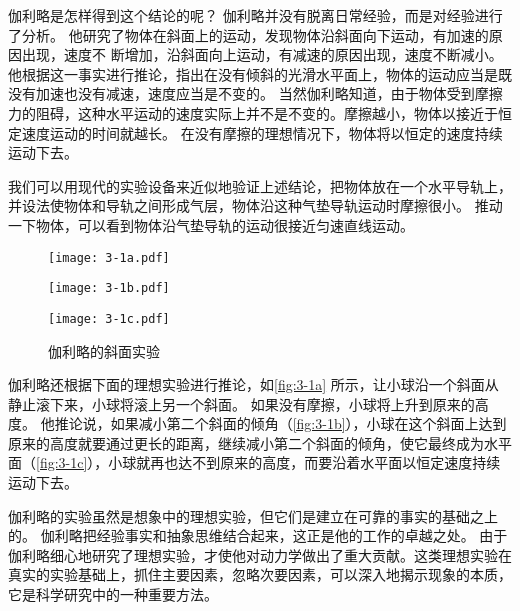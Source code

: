 伽利略是怎样得到这个结论的呢？
伽利略并没有脱离日常经验，而是对经验进行了分析。
他研究了物体在斜面上的运动，发现物体沿斜面向下运动，有加速的原因出现，速度不
断增加，沿斜面向上运动，有减速的原因出现，速度不断减小。
他根据这一事实进行推论，指出在没有倾斜的光滑水平面上，物体的运动应当是既没有加速也没有减速，速度应当是不变的。
当然伽利略知道，由于物体受到摩擦力的阻碍，这种水平运动的速度实际上并不是不变的。摩擦越小，物体以接近于恒定速度运动的时间就越长。
在没有摩擦的理想情况下，物体将以恒定的速度持续运动下去。

我们可以用现代的实验设备来近似地验证上述结论，把物体放在一个水平导轨上，并设法使物体和导轨之间形成气层，物体沿这种气垫导轨运动时摩擦很小。
推动一下物体，可以看到物体沿气垫导轨的运动很接近匀速直线运动。

\begin{figure}
  \begin{minipage}{0.1\linewidth}\centering
    \subcaption{}\label{fig:3-1a}
  \end{minipage}%
  \begin{minipage}{0.85\linewidth}\centering
    \texttt{[image: 3-1a.pdf]}
  \end{minipage}
  \par\medskip
  \begin{minipage}{0.1\linewidth}\centering
    \subcaption{}\label{fig:3-1b}
  \end{minipage}%
  \begin{minipage}{0.85\linewidth}\centering
    \texttt{[image: 3-1b.pdf]}
  \end{minipage}
  \par\medskip
  \begin{minipage}{0.1\linewidth}\centering
    \subcaption{}\label{fig:3-1c}
  \end{minipage}%
  \begin{minipage}{0.85\linewidth}\centering
    \texttt{[image: 3-1c.pdf]}
  \end{minipage}
  \caption{伽利略的斜面实验}\label{fig:3-1}
\end{figure}

伽利略还根据下面的理想实验进行推论，如\cref{fig:3-1a} 所示，让小球沿一个斜面从静止滚下来，小球将滚上另一个斜面。
如果没有摩擦，小球将上升到原来的高度。
他推论说，如果减小第二个斜面的倾角（\cref{fig:3-1b}），小球在这个斜面上达到原来的高度就要通过更长的距离，继续减小第二个斜面的倾角，使它最终成为水平面（\cref{fig:3-1c}），小球就再也达不到原来的高度，而要沿着水平面以恒定速度持续运动下去。

伽利略的实验虽然是想象中的理想实验，但它们是建立在可靠的事实的基础之上的。
伽利略把经验事实和抽象思维结合起来，这正是他的工作的卓越之处。
由于伽利略细心地研究了理想实验，才使他对动力学做出了重大贡献。这类理想实验在真实的实验基础上，抓住主要因素，忽略次要因素，可以深入地揭示现象的本质，它是科学研究中的一种重要方法。

